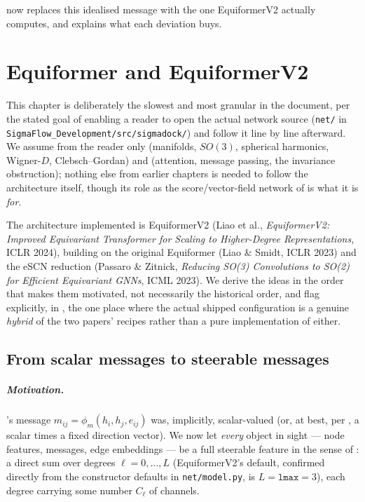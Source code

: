 \documentclass[11pt,a4paper]{report}
\theoremstyle{definition}
\theoremstyle{remark}
\newcommand{\file}[1]{\texttt{#1}}
\begin{document}
 now replaces this idealised message with the one EquiformerV2 actually computes, and explains what each deviation buys.

\clearpage

\chapter{Equiformer and EquiformerV2}
\label{chap:equiformer}

This chapter is deliberately the slowest and most granular in the
document, per the stated goal of enabling a reader to open the actual
network source (\file{net/} in \file{SigmaFlow\_Development/src/sigmadock/})
and follow it line by line afterward. We assume from the reader only
 (manifolds, $SO(3)$, spherical harmonics,
Wigner-$D$, Clebsch--Gordan) and  (attention,
message passing, the invariance obstruction); nothing else from earlier
chapters is needed to follow the architecture itself, though its role as
the score/vector-field network of 
is what it is \emph{for}.

The architecture implemented is EquiformerV2 (Liao et al., \emph{EquiformerV2:
Improved Equivariant Transformer for Scaling to Higher-Degree
Representations}, ICLR 2024), building on the original Equiformer (Liao \&
Smidt, ICLR 2023) and the eSCN reduction (Passaro \& Zitnick, \emph{Reducing
SO(3) Convolutions to SO(2) for Efficient Equivariant GNNs}, ICML 2023). We
derive the ideas in the order that makes them motivated, not necessarily
the historical order, and flag explicitly, in
, the one place where the actual shipped
configuration is a genuine \emph{hybrid} of the two papers' recipes rather
than a pure implementation of either.

\section{From scalar messages to steerable messages}
\label{sec:steerable-messages}

\paragraph{Motivation.} 's message
$m_{ij}=\phi_m(h_i,h_j,e_{ij})$ was, implicitly, scalar-valued (or, at best,
per , a scalar times a fixed direction vector). We
now let \emph{every} object in sight --- node features, messages, edge
embeddings --- be a full steerable feature in the sense of
: a direct sum over degrees
$\ell=0,\dots,L$ (EquiformerV2's default, confirmed directly from the
constructor defaults in \file{net/model.py}, is $L=\texttt{lmax}=3$), each
degree carrying some number $C_\ell$ of channels.
\end{document}
